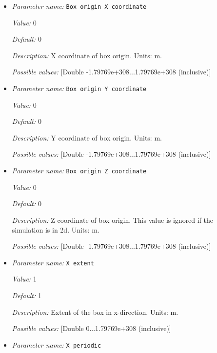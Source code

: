 \begin{itemize}
\item {\it Parameter name:} {\tt Box origin X coordinate}
\label{parameters:Geometry model/Box/Box origin X coordinate}


{\it Value:} 0


{\it Default:} 0


{\it Description:} X coordinate of box origin. Units: m.


{\it Possible values:} [Double -1.79769e+308...1.79769e+308 (inclusive)]
\item {\it Parameter name:} {\tt Box origin Y coordinate}
\label{parameters:Geometry model/Box/Box origin Y coordinate}


{\it Value:} 0


{\it Default:} 0


{\it Description:} Y coordinate of box origin. Units: m.


{\it Possible values:} [Double -1.79769e+308...1.79769e+308 (inclusive)]
\item {\it Parameter name:} {\tt Box origin Z coordinate}
\label{parameters:Geometry model/Box/Box origin Z coordinate}


{\it Value:} 0


{\it Default:} 0


{\it Description:} Z coordinate of box origin. This value is ignored if the simulation is in 2d. Units: m.


{\it Possible values:} [Double -1.79769e+308...1.79769e+308 (inclusive)]
\item {\it Parameter name:} {\tt X extent}
\label{parameters:Geometry model/Box/X extent}


{\it Value:} 1


{\it Default:} 1


{\it Description:} Extent of the box in x-direction. Units: m.


{\it Possible values:} [Double 0...1.79769e+308 (inclusive)]
\item {\it Parameter name:} {\tt X periodic}
\label{parameters:Geometry model/Box/X periodic}



\end{itemize}
